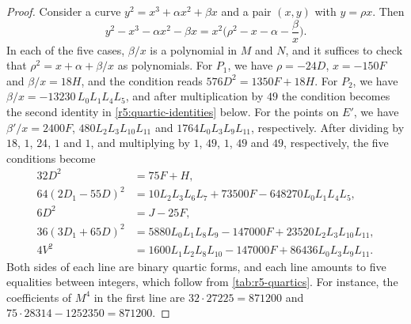\begin{proof}
Consider a curve $y^2=x^3+\alpha x^2+\beta x$ and a pair $(x,y)$ with $y=\rho x$. Then
\[
y^2-x^3-\alpha x^2-\beta x=x^2\Big(\rho^2-x-\alpha-\frac\beta x\Big).
\]
In each of the five cases, $\beta/x$ is a polynomial in $M$ and $N$, and it suffices to check that $\rho^2=x+\alpha+\beta/x$ as polynomials. For $P_1$, we have $\rho=-24D$, $x=-150F$ and $\beta/x=18H$, and the condition reads $576D^2=1350F+18H$. For $P_2$, we have $\beta/x=-13230\,L_0L_1L_4L_5$, and after multiplication by $49$ the condition becomes the second identity in \eqref{r5:quartic-identities} below. For the points on $E'$, we have $\beta'/x=2400F$, $480L_2L_3L_{10}L_{11}$ and $1764L_0L_3L_9L_{11}$, respectively. After dividing by $18$, $1$, $24$, $1$ and $1$, and multiplying by $1$, $49$, $1$, $49$ and $49$, respectively, the five conditions become
\begin{equation}\label{r5:quartic-identities}
\begin{aligned}
32D^2&=75F+H,\\
64(2D_1-55D)^2&=10L_2L_3L_6L_7+73500F-648270L_0L_1L_4L_5,\\
6D^2&=J-25F,\\
36(3D_1+65D)^2&=5880L_0L_1L_8L_9-147000F+23520L_2L_3L_{10}L_{11},\\
4V^2&=1600L_1L_2L_8L_{10}-147000F+86436L_0L_3L_9L_{11}.
\end{aligned}
\end{equation}
Both sides of each line are binary quartic forms, and each line amounts to five equalities between integers, which follow from \cref{tab:r5-quartics}. For instance, the coefficients of $M^4$ in the first line are $32\cdot27225=871200$ and $75\cdot28314-1252350=871200$.
\end{proof}

